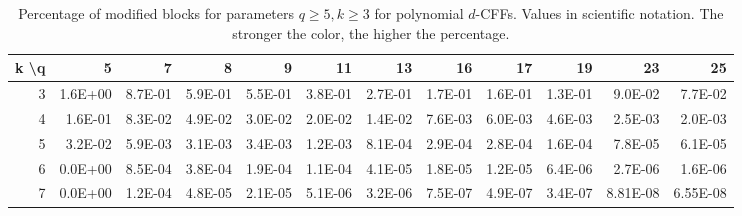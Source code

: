 \begin{table}[ht]
\centering
\tiny
\begin{tabular}{|r|rrrrrrrrrrr}
\hline
\multicolumn{1}{|l|}{k \textbackslash q} & \multicolumn{1}{r|}{5}          & \multicolumn{1}{r|}{7}          & \multicolumn{1}{r|}{8}          & \multicolumn{1}{r|}{9}          & \multicolumn{1}{r|}{11}         & \multicolumn{1}{r|}{13}         & \multicolumn{1}{r|}{16}         & \multicolumn{1}{r|}{17}         & \multicolumn{1}{r|}{19}         & \multicolumn{1}{r|}{23}         & \multicolumn{1}{r|}{25}         \\ \hline
3                                        & \cellcolor[HTML]{E67C73}1.6E+00 & \cellcolor[HTML]{ED9E97}8.7E-01 & \cellcolor[HTML]{F0ABA5}5.9E-01 & \cellcolor[HTML]{F0ADA7}5.5E-01 & \cellcolor[HTML]{F2B5AF}3.8E-01 & \cellcolor[HTML]{F2B9B4}2.7E-01 & \cellcolor[HTML]{F3BEB9}1.7E-01 & \cellcolor[HTML]{F3BEB9}1.6E-01 & \cellcolor[HTML]{F6CAC6}1.3E-01 & \cellcolor[HTML]{F9DBD8}9.0E-02 & \cellcolor[HTML]{FAE0DE}7.7E-02 \\ \cline{1-1}
4                                        & \cellcolor[HTML]{F4BFBA}1.6E-01 & \cellcolor[HTML]{F9DEDB}8.3E-02 & \cellcolor[HTML]{FCECEA}4.9E-02 & \cellcolor[HTML]{FDF3F2}3.0E-02 & \cellcolor[HTML]{FEF7F7}2.0E-02 & \cellcolor[HTML]{FEFAF9}1.4E-02 & \cellcolor[HTML]{FFFCFC}7.6E-03 & \cellcolor[HTML]{FFFDFD}6.0E-03 & \cellcolor[HTML]{FFFEFD}4.6E-03 & \cellcolor[HTML]{FFFEFE}2.5E-03 & \cellcolor[HTML]{FFFFFF}2.0E-03 \\ \cline{1-1}
5                                        & \cellcolor[HTML]{FDF3F2}3.2E-02 & \cellcolor[HTML]{FFFDFD}5.9E-03 & \cellcolor[HTML]{FFFEFE}3.1E-03 & \cellcolor[HTML]{FFFEFE}3.4E-03 & \cellcolor[HTML]{FFFFFF}1.2E-03 & \cellcolor[HTML]{FFFFFF}8.1E-04 & \cellcolor[HTML]{FFFFFF}2.9E-04 & \cellcolor[HTML]{FFFFFF}2.8E-04 & \cellcolor[HTML]{FFFFFF}1.6E-04 & \cellcolor[HTML]{FFFFFF}7.8E-05 & \cellcolor[HTML]{FFFFFF}6.1E-05 \\ \cline{1-1}
6                                        & \cellcolor[HTML]{FFFFFF}0.0E+00 & \cellcolor[HTML]{FFFFFF}8.5E-04 & \cellcolor[HTML]{FFFFFF}3.8E-04 & \cellcolor[HTML]{FFFFFF}1.9E-04 & \cellcolor[HTML]{FFFFFF}1.1E-04 & \cellcolor[HTML]{FFFFFF}4.1E-05 & \cellcolor[HTML]{FFFFFF}1.8E-05 & \cellcolor[HTML]{FFFFFF}1.2E-05 & \cellcolor[HTML]{FFFFFF}6.4E-06 & \cellcolor[HTML]{FFFFFF}2.7E-06 & \cellcolor[HTML]{FFFFFF}1.6E-06 \\ \cline{1-1}
7                                        & \cellcolor[HTML]{FFFFFF}0.0E+00 & \cellcolor[HTML]{FFFFFF}1.2E-04 & \cellcolor[HTML]{FFFFFF}4.8E-05 & \cellcolor[HTML]{FFFFFF}2.1E-05 & \cellcolor[HTML]{FFFFFF}5.1E-06 & \cellcolor[HTML]{FFFFFF}3.2E-06 & \cellcolor[HTML]{FFFFFF}7.5E-07 & \cellcolor[HTML]{FFFFFF}4.9E-07 & \cellcolor[HTML]{FFFFFF}3.4E-07 & \multicolumn{1}{l}{8.81E-08}           &
\multicolumn{1}{l}{6.55E-08}           \\ \cline{1-1}
\end{tabular}
    \caption{Percentage of modified blocks for parameters $q \geq 5, k \geq 3$ for polynomial $d$-CFFs. Values in scientific notation. The stronger the color, the higher the percentage.}
    \label{table:d-polynomial-cff-modified-blocks}
\end{table}